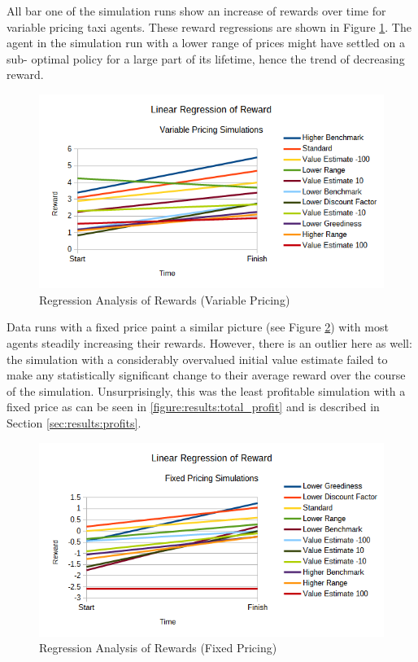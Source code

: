 All bar one of the simulation runs show an increase of rewards over time for
variable pricing taxi agents. These reward regressions are shown in Figure
\ref{figure:results:variable_rewards}. The agent in the simulation run with a
lower range of prices might have settled on a sub- optimal policy for a large
part of its lifetime, hence the trend of decreasing reward.

\begin{figure}
\begin{center}
  \includegraphics[width=\textwidth]{../figures/reward_regression_variable}
  \caption{
    Regression Analysis of Rewards (Variable Pricing)
    \label{figure:results:variable_rewards}
  }
\end{center}
\end{figure}

Data runs with a fixed price paint a similar picture (see Figure
\ref{figure:results:fixed_rewards}) with most agents steadily increasing their
rewards. However, there is an outlier here as well: the simulation with a
considerably overvalued initial value estimate failed to make any statistically
significant change to their average reward over the course of the simulation.
Unsurprisingly, this was the least profitable simulation with a fixed price as
can be seen in \ref{figure:results:total_profit} and is described in Section
\ref{sec:results:profits}.

\begin{figure}
\begin{center}
  \includegraphics[width=\textwidth]{../figures/reward_regression_fixed}
  \caption{
    Regression Analysis of Rewards (Fixed Pricing)
    \label{figure:results:fixed_rewards}
  }
\end{center}
\end{figure}

